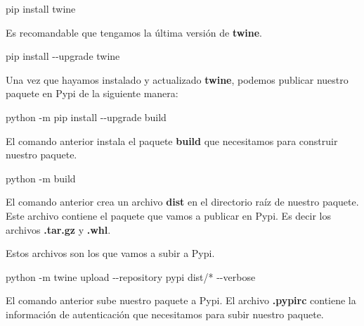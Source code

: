 \documentclass[
  a4paper,
  DIV=11,
  numbers=noendperiod,
  onepage,
  openany]{scrreprt}
\newenvironment{Shaded}{\begin{snugshade}}{\end{snugshade}}
\newcommand{\AttributeTok}[1]{\textcolor[rgb]{0.40,0.45,0.13}{#1}}
\newcommand{\ExtensionTok}[1]{\textcolor[rgb]{0.00,0.23,0.31}{#1}}
\newcommand{\NormalTok}[1]{\textcolor[rgb]{0.00,0.23,0.31}{#1}}
\newcommand{\PreprocessorTok}[1]{\textcolor[rgb]{0.68,0.00,0.00}{#1}}
\begin{document}
\begin{tcolorbox}
\begin{Shaded}
\begin{Highlighting}[]
\ExtensionTok{pip}\NormalTok{ install twine}
\end{Highlighting}
\end{Shaded}

Es recomandable que tengamos la última versión de \textbf{twine}.

\begin{Shaded}
\begin{Highlighting}[]
\ExtensionTok{pip}\NormalTok{ install }\AttributeTok{{-}{-}upgrade}\NormalTok{ twine}
\end{Highlighting}
\end{Shaded}

Una vez que hayamos instalado y actualizado \textbf{twine}, podemos
publicar nuestro paquete en Pypi de la siguiente manera:

\begin{Shaded}
\begin{Highlighting}[]
\ExtensionTok{python} \AttributeTok{{-}m}\NormalTok{ pip install }\AttributeTok{{-}{-}upgrade}\NormalTok{ build}
\end{Highlighting}
\end{Shaded}

El comando anterior instala el paquete \textbf{build} que necesitamos
para construir nuestro paquete.

\begin{Shaded}
\begin{Highlighting}[]
\ExtensionTok{python} \AttributeTok{{-}m}\NormalTok{ build}
\end{Highlighting}
\end{Shaded}

El comando anterior crea un archivo \textbf{dist} en el directorio raíz
de nuestro paquete. Este archivo contiene el paquete que vamos a
publicar en Pypi. Es decir los archivos \textbf{.tar.gz} y
\textbf{.whl}.

Estos archivos son los que vamos a subir a Pypi.

\begin{Shaded}
\begin{Highlighting}[]
\ExtensionTok{python} \AttributeTok{{-}m}\NormalTok{ twine upload }\AttributeTok{{-}{-}repository}\NormalTok{ pypi dist/}\PreprocessorTok{*} \AttributeTok{{-}{-}verbose}
\end{Highlighting}
\end{Shaded}

El comando anterior sube nuestro paquete a Pypi. El archivo
\textbf{.pypirc} contiene la información de autenticación que
necesitamos para subir nuestro paquete.


\end{tcolorbox}
\end{document}
